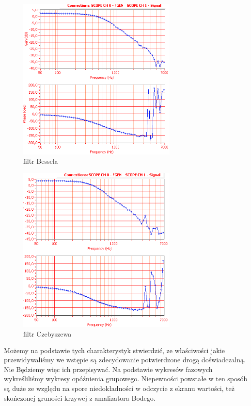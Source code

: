 \documentclass[a4paper,11pt]{article}
\begin{document}
\begin{figure}[H]
\begin{center}
\includegraphics[width=8cm]{obrazki/belzebub1bialy.png}
\end{center}
\caption{filtr Bessela}
\end{figure}

\begin{figure}[H]
\begin{center}
\includegraphics[width=8cm]{obrazki/trzebieszow1bialy.png}
\end{center}
\caption{filtr Czebyszewa}
\end{figure}

Możemy na podstawie tych charakterystyk stwierdzić, ze właściwości jakie przewidywaliśmy we wstępie są zdecydowanie potwierdzone drogą doświadczalną. Nie Będziemy więc ich przepisywać. Na podstawie wykresów fazowych wykreśliliśmy wykresy opóźnienia grupowego. Niepewności powstałe w ten sposób są duże ze względu na spore niedokładności w odczycie z ekranu wartości, też skończonej gruności krzywej z amalizatora Bodego. 
\end{document}
